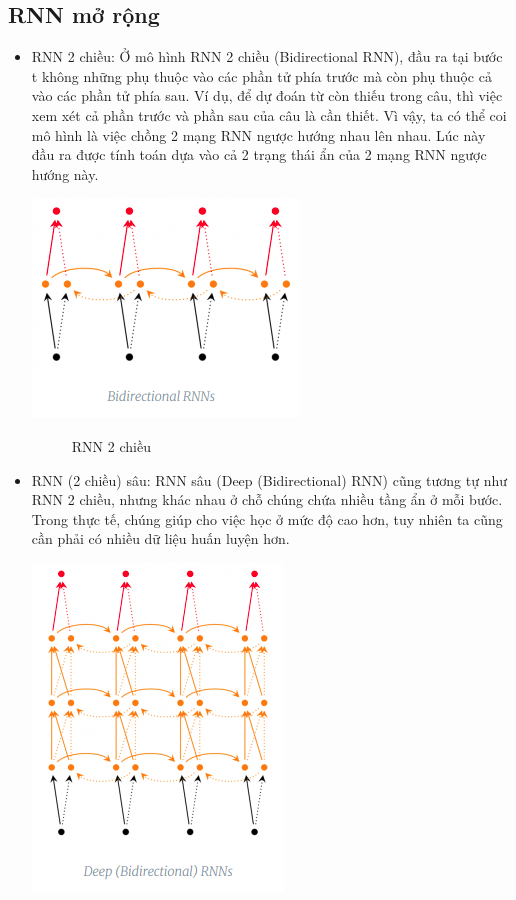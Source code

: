 \subsection{RNN mở rộng}
\begin{itemize}
    \item RNN 2 chiều: Ở mô hình RNN 2 chiều (Bidirectional RNN), đầu ra tại bước t không những phụ thuộc vào các phần tử phía trước mà còn phụ thuộc cả vào các phần tử phía sau. Ví dụ, để dự đoán từ còn thiếu trong câu, thì việc xem xét cả phần trước và phần sau của câu là cần thiết. Vì vậy, ta có thể coi mô hình là việc chồng 2 mạng RNN ngược hướng nhau lên nhau. Lúc này đầu ra được tính toán dựa vào cả 2 trạng thái ẩn của 2 mạng RNN ngược hướng này.
    \begin{center}
    \includegraphics[scale=.5]{image/chapter6/RNN-2.png}
    \begin{figure}[htp]
    \begin{center}
     
    \end{center}
    \caption{RNN 2 chiều \cite{rnn-basic}}
    \end{figure}
    \end{center}
    \item RNN (2 chiều) sâu: RNN sâu (Deep (Bidirectional) RNN) cũng tương tự như RNN 2 chiều, nhưng khác nhau ở chỗ chúng chứa nhiều tầng ẩn ở mỗi bước. Trong thực tế, chúng giúp cho việc học ở mức độ cao hơn, tuy nhiên ta cũng cần phải có nhiều dữ liệu huấn luyện hơn.
    \begin{center}
    \includegraphics[scale=.3]{image/chapter6/RNN-4.png}
    \begin{figure}[htp]
    \begin{center}
     

\end{center}
\end{figure}
\end{center}
\end{itemize}
